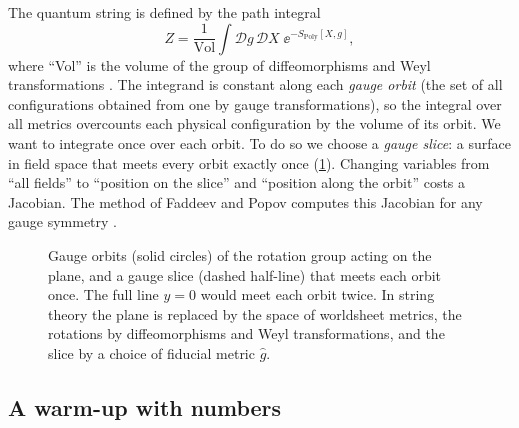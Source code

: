 The quantum string is defined by the path integral
\begin{equation}\label{eq:ghosts:Z}
  Z=\frac{1}{\mathrm{Vol}}\int \mathcal{D}g\,\mathcal{D}X\;\ee^{-S_{\mathrm{Poly}}[X,g]},
\end{equation}
where ``Vol'' is the volume of the group of diffeomorphisms and Weyl transformations
. The integrand is constant along each \emph{gauge
orbit} (the set of all configurations obtained from one by gauge
transformations), so the integral over all metrics overcounts each physical configuration by
the volume of its orbit. We want to integrate once over each orbit. To do so we choose a
\emph{gauge slice}: a surface in field space that meets every orbit exactly once
(\cref{fig:ghosts:orbits}). Changing variables from ``all fields'' to ``position on the
slice'' and ``position along the orbit'' costs a Jacobian. The method of Faddeev and Popov
 computes this Jacobian for any gauge symmetry
.

\begin{figure}[ht]
\centering
{}
\caption{Gauge orbits (solid circles) of the rotation group acting on the plane, and a gauge
slice (dashed half-line) that meets each orbit once. The full line $y=0$ would meet each orbit
twice. In string theory the plane is replaced by the space of worldsheet metrics, the rotations
by diffeomorphisms and Weyl transformations, and the slice by a choice of fiducial metric
$\hat g$.}
\label{fig:ghosts:orbits}
\end{figure}

\subsection{A warm-up with numbers}

